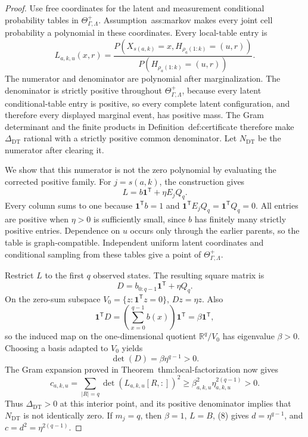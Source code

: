 \documentclass{article}
\begin{document}
\begin{proof}
Use free coordinates for the latent and measurement conditional probability tables in \(\Theta_{\Gamma,\Lambda}^{+}\).  Assumption~\textnormal{ass:markov} makes every joint cell probability a polynomial in these coordinates.  Every local-table entry is
\[
 L_{a,k,u}(x,r)
 =\frac{P(X_{s(a,k)}=x,
 H_{\rho_a(1:k)}=(u,r))}
 {P(H_{\rho_a(1:k)}=(u,r))}.
\tag{7}
\]
The numerator and denominator are polynomial after marginalization.  The denominator is strictly positive throughout \(\Theta_{\Gamma,\Lambda}^{+}\), because every latent conditional-table entry is positive, so every complete latent configuration, and therefore every displayed marginal event, has positive mass.  The Gram determinant and the finite products in Definition~\textnormal{def:certificate} therefore make \(\Delta_{\mathrm{DT}}\) rational with a strictly positive common denominator.  Let \(N_{\mathrm{DT}}\) be the numerator after clearing it.

We show that this numerator is not the zero polynomial by evaluating the corrected positive family.  For \(j=s(a,k)\), the construction gives
\[
 L=b\mathbf1^{\mathsf T}+\eta E_jQ_q.
\]
Every column sums to one because \(\mathbf1^{\mathsf T}b=1\) and \(\mathbf1^{\mathsf T}E_jQ_q=\mathbf1^{\mathsf T}Q_q=0\).  All entries are positive when \(\eta>0\) is sufficiently small, since \(b\) has finitely many strictly positive entries.  Dependence on \(u\) occurs only through the earlier parents, so the table is graph-compatible.  Independent uniform latent coordinates and conditional sampling from these tables give a point of \(\Theta_{\Gamma,\Lambda}^{+}\).

Restrict \(L\) to the first \(q\) observed states.  The resulting square matrix is
\[
 D=b_{0:q-1}\mathbf1^{\mathsf T}+\eta Q_q.
\]
On the zero-sum subspace \(V_0=\{z:\mathbf1^{\mathsf T}z=0\}\), \(Dz=\eta z\).  Also
\[
 \mathbf1^{\mathsf T}D
 =\left(\sum_{x=0}^{q-1}b(x)\right)\mathbf1^{\mathsf T}
 =\beta\mathbf1^{\mathsf T},
\]
so the induced map on the one-dimensional quotient \(\mathbb R^q/V_0\) has eigenvalue \(\beta>0\).  Choosing a basis adapted to \(V_0\) yields
\[
 \det(D)=\beta\eta^{q-1}>0.
\tag{8}
\]
The Gram expansion proved in Theorem~\textnormal{thm:local-factorization} now gives
\[
 c_{a,k,u}
 =\sum_{|R|=q}\det(L_{a,k,u}[R,:])^2
 \ge \beta_{a,k,u}^2\eta_{a,k,u}^{2(q-1)}>0.
\tag{9}
\]
Thus \(\Delta_{\mathrm{DT}}>0\) at this interior point, and its positive denominator implies that \(N_{\mathrm{DT}}\) is not identically zero.  If \(m_j=q\), then \(\beta=1\), \(L=B\), (8) gives \(d=\eta^{q-1}\), and \(c=d^2=\eta^{2(q-1)}\).


\end{proof}
\end{document}
